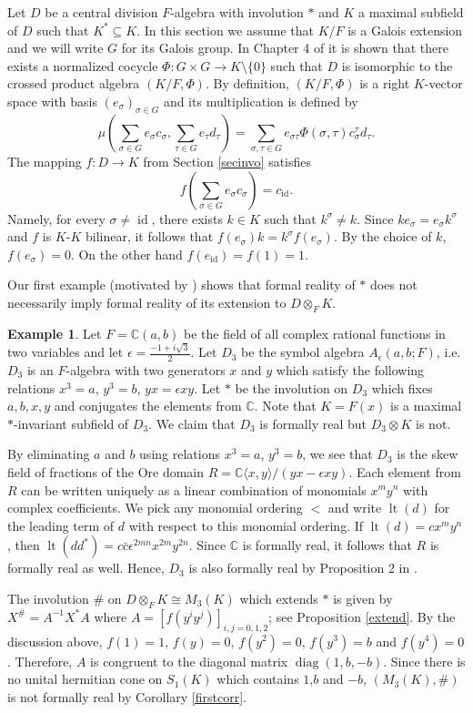 \documentclass[12pt,reqno]{amsart}
\theoremstyle{definition}
\newtheorem{ex}{Example}
\providecommand{\CC}{\mathbb{C}}
\DeclareMathOperator{\lt}{lt}
\DeclareMathOperator{\id}{id}
\DeclareMathOperator{\diag}{diag}
\begin{document}
Let $D$ be a central division $F$-algebra with involution $\ast$
and $K$ a maximal subfield of $D$ such that $K^\ast \subseteq K$.
In this section we assume that $K/F$ is a Galois extension and we will
write $G$ for its Galois group. In Chapter 4 of \cite{hers} it is shown that 
there exists a normalized cocycle $\Phi \colon G \times G \to K \setminus \{0\}$
such that $D$ is isomorphic to the crossed product algebra $(K/F,\Phi)$.
By definition, $(K/F,\Phi)$ is a right $K$-vector space with basis
$(e_\sigma)_{\sigma \in G}$ and its multiplication is defined by
\[
\mu \left( \sum_{\sigma \in G} e_\sigma c_\sigma, \sum_{\tau \in G} e_\tau d_\tau \right)
= \sum_{\sigma, \tau \in G} e_{\sigma \tau} \Phi(\sigma,\tau) c_\sigma^\tau d_\tau.
\]
The mapping $f \colon D \to K$ from Section \ref{secinvo} satisfies 
\[
f(\sum_{\sigma \in G} e_\sigma c_\sigma)=c_{\id}.
\]
Namely, for every $\sigma \ne \id$, there exists $k \in K$ such that $k^\sigma \ne k$.
Since $k e_\sigma = e_\sigma k^\sigma$ and $f$ is $K$-$K$ bilinear, it follows that
$f(e_\sigma) k =k^\sigma f(e_\sigma)$. By the choice of $k$, $f(e_\sigma)=0$.
On the other hand $f(e_{\id}) = f(1) =1$.

Our first example (motivated by \cite{ms}) shows that formal reality of $\ast$ does not necessarily imply
formal reality of its extension to $D \otimes_F K$. 

\begin{ex} 
\label{mainex}
Let $F=\CC(a,b)$ be the field of all complex rational functions in two variables
and let $\epsilon = \frac{-1+i\sqrt{3}}{2}$. Let $D_3$ be the symbol algebra
$A_\epsilon(a,b;F)$, i.e. $D_3$ is an $F$-algebra with two generators $x$ and $y$ 
which satisfy the following relations $x^3=a$, $y^3=b$, $yx=\epsilon xy$. 
Let $\ast$ be the involution on $D_3$ which fixes $a,b,x,y$ and conjugates
the elements from $\CC$. Note that $K = F(x)$ is a maximal $\ast$-invariant 
subfield of $D_3$. We claim that $D_3$ is formally real but $D_3 \otimes K$ is not.

By eliminating $a$ and $b$ using relations $x^3=a$, $y^3=b$, we see that 
$D_3$ is the skew field of fractions of the Ore domain
$R = \CC \langle x, y \rangle/ (yx-\epsilon xy)$.
Each element from $R$ can be written uniquely as a linear combination of monomials
$x^m y^n$ with complex coefficients. We pick any monomial ordering $<$ and write $\lt(d)$
for the leading term of $d$ with respect to this monomial ordering. If $\lt(d)=cx^my^n$,
then $\lt(d d^\ast) = c \bar{c} \epsilon^{2mn} x^{2m} y^{2n}$. Since $\CC$ is
formally real, it follows that $R$ is formally real as well. Hence, $D_3$ is also formally real
by Proposition 2 in \cite{ci2}.

The involution $\#$ on $D \otimes_F K \cong M_3(K)$ which extends $\ast$ is given by
$X^\# = A^{-1} X^\ast A$ where  $A = [f(y^i y^j)]_{i,j=0,1,2}$; see Proposition \ref{extend}.
By the discussion above, $f(1)=1$, $f(y)=0$, $f(y^2)=0$, $f(y^3)=b$ and $f(y^4)=0$.
Therefore, $A$ is congruent to the diagonal matrix $\diag(1,b,-b)$. 
Since there is no unital hermitian cone on $S_1(K)$ which contains $1$,$b$ and $-b$, 
$(M_3(K),\#)$ is not formally real by Corollary \ref{firstcorr}.
\end{ex}
\end{document}
